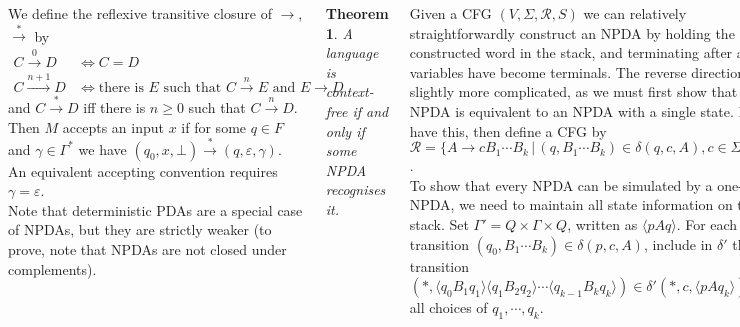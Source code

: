 \documentclass{tikzposter} %
\newtheorem{theorem}{Theorem}
\begin{document}
\begin{columns}
{  We define the reflexive transitive closure of $\to$, $\overset{*}{\rightarrow}$ by
  \begin{align*}
    C \overset{0}{\longrightarrow} D &\iff C = D \\
    C \overset{n+1}{\longrightarrow} D &\iff \text{there is $E$ such that $C \overset{n}{\longrightarrow} E$ and $E \to D$}
  \end{align*}
  and $C \overset{*}{\to} D$ iff there is $n \ge 0$ such that $C \overset{n}{\to} D$. Then $M$ accepts an input $x$ if for some $q \in F$ and $\gamma \in \Gamma^{*}$ we have $(q_{0}, x, \bot) \overset{*}{\to} (q, \varepsilon, \gamma)$. An equivalent accepting convention requires $\gamma = \varepsilon$.\\

  Note that deterministic PDAs are a special case of NPDAs, but they are strictly weaker (to prove, note that NPDAs are not closed under complements). \\

  \begin{theorem}
    A language is context-free if and only if some NPDA recognises it.
  \end{theorem}
  \hphantom{}

  Given a CFG $(V, \Sigma, \mathcal{R}, S)$ we can relatively straightforwardly construct an NPDA by holding the constructed word in the stack, and terminating after all variables have become terminals. The reverse direction is slightly more complicated, as we must first show that any NPDA is equivalent to an NPDA with a single state. If we have this, then define a CFG by $\mathcal{R} = \{A \to cB_{1} \cdots B_{k} \,|\, (q, B_{1}\cdots B_{k}) \in \delta(q, c, A), c \in \Sigma \cup \{\varepsilon\}\}$. \\

  To show that every NPDA can be simulated by a one-state NPDA, we need to maintain all state information on the stack. Set $\Gamma' = Q \times \Gamma \times Q$, written as $\langle p A q\rangle$. For each transition $(q_{0}, B_{1} \cdots B_{k}) \in \delta(p, c, A)$, include in $\delta'$ the transition $(*, \langle q_{0} B_{1} q_{1} \rangle \langle q_{1} B_{2} q_{2} \rangle \cdots \langle q_{k-1} B_{k} q_{k} \rangle) \in \delta'(*, c, \langle p A q_{k} \rangle)$ for all choices of $q_{1}, \cdots, q_{k}$. \\

}
\end{columns}
\end{document}
